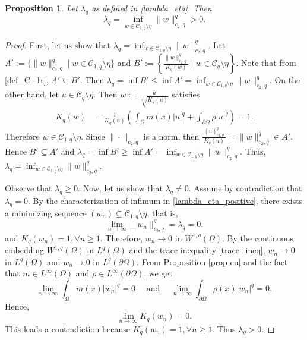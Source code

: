 \documentclass[pdflatex,sn-mathphys-num]{sn-jnl}
\theoremstyle{thmstyleone}%
\newtheorem{proposition}[theorem]{Proposition}%
\theoremstyle{thmstyletwo}%
\theoremstyle{thmstylethree}%
\theoremstyle{thmstylethree}%
\begin{document}
\begin{proposition}\label{lamda_qpositive}
Let $\lambda_q$ as defined in \eqref{lambda_eta}. Then
\begin{equation}\label{lambda_eta_positive}
\lambda _q =\inf_{w \in \mathcal{C}_{1,q} \setminus \eta } \|w\|_{c_2,q}^q >0. 
\end{equation}
\end{proposition} 
\begin{proof}
    First, let us show that $\lambda _q =\inf_{w \in \mathcal{C}_{1,q} \setminus \eta } \|w\|_{c_2,q}^q.$ Let $A':=\{ \|w\|_{c_2, q}^q\; |\; w\in \mathcal{C}_{1,q}\setminus \eta\}$ and $B':=\left\{ \frac{\|w\|_{c_2, q}^q}{K_q(w)}\; |\;  w\in \mathcal{C}_q\setminus \eta\right\}$. Note that from \eqref{def_C_1r}, $A'\subseteq B'$. Then $\lambda_q=\inf B'\leqslant \inf A'=\inf_{w \in \mathcal{C}_{1,q} \setminus \eta } \|w\|_{c_2,q}^q.$ On the other hand, let $u\in \mathcal{C}_q\setminus \eta$. Then $w:=\frac{u}{\sqrt[q]{K_q(u)}}$  satisfies
\begin{align*}
    K_q(w)& = \frac{1}{K_q(u)} \left(\int_\Omega m(x)|u|^q+\int_{\partial\Omega}\rho |u|^q\right)=1.
\end{align*}
Therefore $w\in \mathcal{C}_{1,q}\setminus \eta$. 
Since $\|\cdot \|_{c_2, q}$ is a norm, then $\frac{\|u\|_{c_2,q}^q}{K_q(u)}=\|w\|_{c_2,q}^q\in A'$. Hence $B'\subseteq A'$ and $\lambda_q=\inf B'\geqslant \inf A'=\inf_{w \in \mathcal{C}_{1,q} \setminus \eta } \|w\|_{c_2,q}^q.$ Thus,  $\lambda _q =\inf_{w \in \mathcal{C}_{1,q} \setminus \eta } \|w\|_{c_2,q}^q $.
\par Observe that  $\lambda_q\geqslant 0.$  Now, let us show that $\lambda_q\ne 0$. Assume by contradiction that $\lambda_q=0$. By the characterization  of infimum in \eqref{lambda_eta_positive}, there exists a minimizing sequence $(w_n)\subseteq \mathcal{C}_{1,q} \setminus \eta$, that is, 
\begin{equation*}\label{limi}
    \lim_{n\to \infty}\|w_n\|_{c_2,q}^q=\lambda_q=0.
\end{equation*}
and $K_q(w_n)=1, \forall n\geqslant 1.$ Therefore, $w_n\to 0$ in $W^{1,q}(\Omega)$. By the continuous  embedding $W^{1,q}(\Omega) $ in $L^q(\Omega)$ and the trace inequality \eqref{trace_ineq}, $w_n\to 0$ in $L^{q}(\Omega)$ and $w_n\to 0$ in $L^{q}(\partial\Omega)$. 
From Proposition \ref{prop-cu} and the fact that $m\in L^\infty (\Omega)$ and $\rho \in L^\infty (\partial\Omega)$, we get 
\begin{equation*}
    \lim_{n\to \infty}      \int_\Omega m(x)|w_{n}|^q=0 \quad
\mbox{ and } \quad
 \lim_{n\to \infty}      \int_{\partial\Omega} \rho(x)|w_{n}|^q=0.
\end{equation*}
Hence,
\begin{equation*}
    \lim_{n\to \infty}K_q(w_{n})=0.
\end{equation*}
This leads a contradiction because $K_q(w_n)=1, \forall n\geqslant 1.$ Thus $\lambda_q>0.$
\end{proof}
\end{document}
